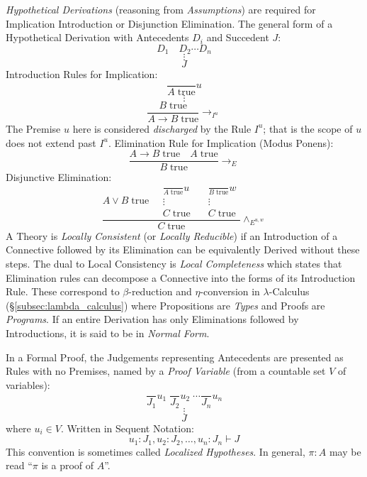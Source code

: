 \documentclass{article}
\begin{document}
\emph{Hypothetical Derivations} (reasoning from \emph{Assumptions})
are required for Implication Introduction or Disjunction
Elimination. The general form of a Hypothetical Derivation with
Antecedents $D_i$ and Succedent $J$:
\[
    D_1 \quad D_2 \cdots D_n
\]\[
    \vdots
\]\[
    J
\]
Introduction Rules for Implication:
\[
    {
        \frac{}
        {A\;\mathrm{true}}
    } u
\]\[
    \vdots
\]\[
    {
        \frac{B\;\mathrm{true}}
        {A \rightarrow B\;\mathrm{true}}
    } \rightarrow_{I^u}
\]
The Premise $u$ here is considered \emph{discharged} by the Rule
$I^u$; that is the scope of $u$ does not extend past $I^u$.
Elimination Rule for Implication (Modus Ponens):
\[
    {
        \frac{A \rightarrow B\;\mathrm{true} \quad A\;\mathrm{true}}
        {B\;\mathrm{true}}
    } \rightarrow_{E}
\]
Disjunctive Elimination:
\[
    \frac{
    A \vee B\;\mathrm{true} \quad
    \begin{matrix}
        {
            \frac{}
            {A\;\mathrm{true}}
        }u \\
        \vdots \\
        C\;\mathrm{true}
    \end{matrix}
    \quad
    \begin{matrix}
        {
            \frac{}
            {B\;\mathrm{true}}
        }w \\
        \vdots \\
        C\;\mathrm{true}
    \end{matrix}
    }{ C\;\mathrm{true}}\wedge_{E^{u,w}}
\]
A Theory is \emph{Locally Consistent} (or \emph{Locally Reducible}) if
an Introduction of a Connective followed by its Elimination can be
equivalently Derived without these steps.  The dual to Local
Consistency is \emph{Local Completeness} which states that Elimination
rules can decompose a Connective into the forms of its Introduction
Rule. These correspond to $\beta$-reduction and $\eta$-conversion in
$\lambda$-Calculus (\S\ref{subsec:lambda_calculus}) where Propositions
are \emph{Types} and Proofs are \emph{Programs}. If an entire
Derivation has only Eliminations followed by Introductions, it is said
to be in \emph{Normal Form}.

In a Formal Proof, the Judgements representing Antecedents are
presented as Rules with no Premises, named by a \emph{Proof Variable}
(from a countable set $V$ of variables):
\[
    \frac{}{J_1}u_1 \; \frac{}{J_2}u_2 \; \cdots \frac{}{J_n}u_n
\]\[
    \vdots
\]\[
    J
\]
where $u_i \in V$. Written in Sequent Notation:
\[
    u_1:J_1, u_2:J_2, \ldots, u_n:J_n \vdash J
\]
This convention is sometimes called \emph{Localized Hypotheses}. In
general, $\pi : A$ may be read ``$\pi$ is a proof of $A$''.
\end{document}
